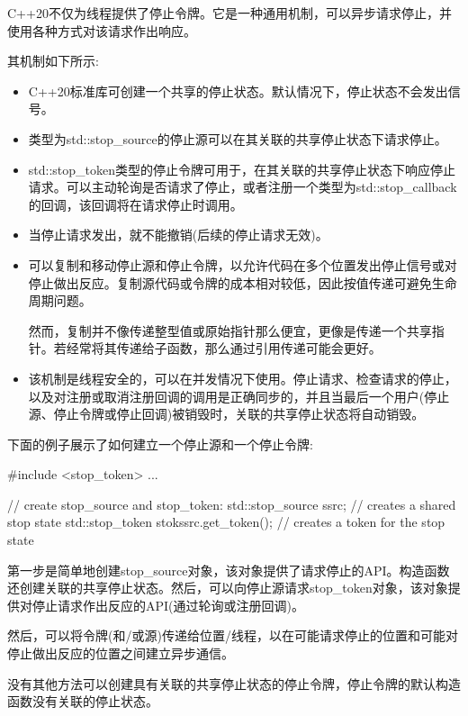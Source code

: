 
C++20不仅为线程提供了停止令牌。它是一种通用机制，可以异步请求停止，并使用各种方式对该请求作出响应。

其机制如下所示:

\begin{itemize}
\item 
C++20标准库可创建一个共享的停止状态。默认情况下，停止状态不会发出信号。

\item 
类型为std::stop\_source的停止源可以在其关联的共享停止状态下请求停止。

\item 
std::stop\_token类型的停止令牌可用于，在其关联的共享停止状态下响应停止请求。可以主动轮询是否请求了停止，或者注册一个类型为std::stop\_callback的回调，该回调将在请求停止时调用。

\item 
当停止请求发出，就不能撤销(后续的停止请求无效)。

\item 
可以复制和移动停止源和停止令牌，以允许代码在多个位置发出停止信号或对停止做出反应。复制源代码或令牌的成本相对较低，因此按值传递可避免生命周期问题。

然而，复制并不像传递整型值或原始指针那么便宜，更像是传递一个共享指针。若经常将其传递给子函数，那么通过引用传递可能会更好。

\item 
该机制是线程安全的，可以在并发情况下使用。停止请求、检查请求的停止，以及对注册或取消注册回调的调用是正确同步的，并且当最后一个用户(停止源、停止令牌或停止回调)被销毁时，关联的共享停止状态将自动销毁。
\end{itemize}

下面的例子展示了如何建立一个停止源和一个停止令牌:

\begin{cpp}
#include <stop_token>
...

// create stop_source and stop_token:
std::stop_source ssrc; // creates a shared stop state
std::stop_token stok{ssrc.get_token()}; // creates a token for the stop state
\end{cpp}

第一步是简单地创建stop\_source对象，该对象提供了请求停止的API。构造函数还创建关联的共享停止状态。然后，可以向停止源请求stop\_token对象，该对象提供对停止请求作出反应的API(通过轮询或注册回调)。

然后，可以将令牌(和/或源)传递给位置/线程，以在可能请求停止的位置和可能对停止做出反应的位置之间建立异步通信。

没有其他方法可以创建具有关联的共享停止状态的停止令牌，停止令牌的默认构造函数没有关联的停止状态。

